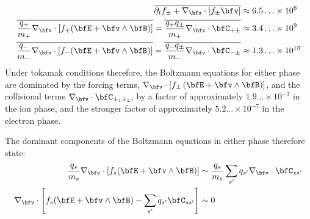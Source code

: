     \begin{align}
        \overline{\partial_{t}f_{\pm} + \nabla_{\bfx}\cdot[f_{\pm}\bfv]}  &\approx  6.5\ldots\times 10^{6}  \\
        \overline{\frac{q_{+}}{m_{+}}\nabla_{\bfv}\cdot[f_{+}(\bfE + \bfv\wedge\bfB)]}  =  \overline{\frac{q_{+}q_{\pm}}{m_{+}}\nabla_{\bfv}\cdot\bfC_{+\pm}}  &\approx  3.4\ldots\times 10^{9}  \\
        \overline{\frac{q_{-}}{m_{-}}\nabla_{\bfv}\cdot[f_{-}(\bfE + \bfv\wedge\bfB)]}  =  \overline{\frac{q_{-}q_{\pm}}{m_{-}}\nabla_{\bfv}\cdot\bfC_{-\pm}}  &\approx  1.3\ldots\times 10^{13}
    \end{align}
    Under tokamak conditions therefore, the Boltzmann equations for either phase are dominated by the forcing terms, $\nabla_{\bfv}\cdot[f_{\pm}\left(\bfE + \bfv\wedge\bfB\right)]$, and the collisional terms $\nabla_{\bfv}\cdot\bfC_{\pm_{1}\pm_{2}}$, by a factor of approximately $1.9\ldots\times 10^{- 3}$ in the ion phase, and the stronger factor of approximately $5.2\ldots\times 10^{- 7}$ in the electron phase.


    The dominant components of the Boltzmann equations in either phase therefore state:
    \begin{align}
        \frac{q_{s}}{m_{s}}\nabla_{\bfv}\cdot[f_{s}(\bfE + \bfv\wedge\bfB)]  &\sim  \frac{q_{s}}{m_{s}}\sum_{s'}q_{s'}\nabla_{\bfv}\cdot\bfC_{ss'}  \\
        \nabla_{\bfv}\cdot\left[f_{s}(\bfE + \bfv\wedge\bfB) - \sum_{s'}q_{s'}\bfC_{ss'}\right]  &\sim  0
    \end{align}
    